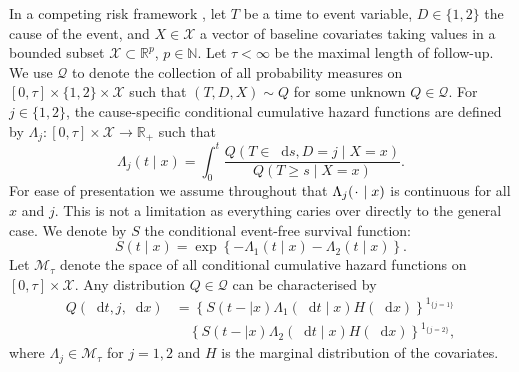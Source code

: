 \documentclass{statsoc}
\newcommand{\R}{\mathbb{R}}
\newcommand{\N}{\mathbb{N}}
\newcommand{\blank}{\makebox[1ex]{\textbf{$\cdot$}}}
\newcommand*\diff{\mathop{}\!\mathrm{d}}
\newcommand{\1}{\mathds{1}}
\begin{document}
In a competing risk framework \citep{andersen2012statistical}, let \( T\) be a
time to event variable, \(D\in\{1,2\}\) the cause of the event, and
$X \in \mathcal{X}$ a vector of baseline covariates taking values in a bounded
subset \( \mathcal{X} \subset \R^p \), \( p\in\N \). Let $\tau< \infty$ be the
maximal length of follow-up. We use \( \mathcal{Q} \) to denote the collection
of all probability measures on \( [0,\tau] \times \{1,2\}\times \mathcal{X} \)
such that \( (T, D, X) \sim Q \) for some unknown \( Q \in \mathcal{Q} \). For
\(j\in\{1,2\}\), the cause-specific conditional cumulative hazard functions are
defined by
\( \Lambda_{j} \colon [0, \tau] \times \mathcal{X} \rightarrow \R_+ \) such that
\begin{equation*}
  \Lambda_{j}(t \mid x) = \int_0^t\frac{  Q(T \in \diff s, D=j \mid X=x )}{Q(T \geq s \mid X=x )}.
\end{equation*}
For ease of presentation we assume throughout that
\( \Lambda_j(\blank \mid x) \) is continuous for all \( x \) and
\( j \). This is not a limitation as everything caries over directly
to the general case. We denote by \(S\) the conditional event-free
survival function:
\begin{equation}
  \label{eq:surv-def}
  S(t \mid x)=\exp\left\{-\Lambda_{1}(t \mid x)-\Lambda_{2}(t \mid x)\right\}.
\end{equation}
Let \( \mathcal{M}_{\tau}\) denote the space of all conditional cumulative hazard
functions on \( [0,\tau] \times\mathcal{X}\). Any distribution
\( Q \in \mathcal{Q} \) can be characterised by
\begin{equation*}
  \label{eq:parametrizeQ}
  \begin{split}
    Q(\diff t,j,\diff x)&= \left\{S(t- \mid x)\Lambda_1(\diff t \mid x)H(\diff x)\right\}^{1_{\{j=1\}}}\\
                        &\quad\left\{S(t- \mid x)\Lambda_2(\diff t \mid x)H(\diff x)\right\}^{1_{\{j=2\}}},
  \end{split}
\end{equation*}
where \(\Lambda_{j} \in \mathcal{M}_{\tau}\) for \(j=1,2\) and \(H\) is the marginal
distribution of the covariates.
\end{document}

